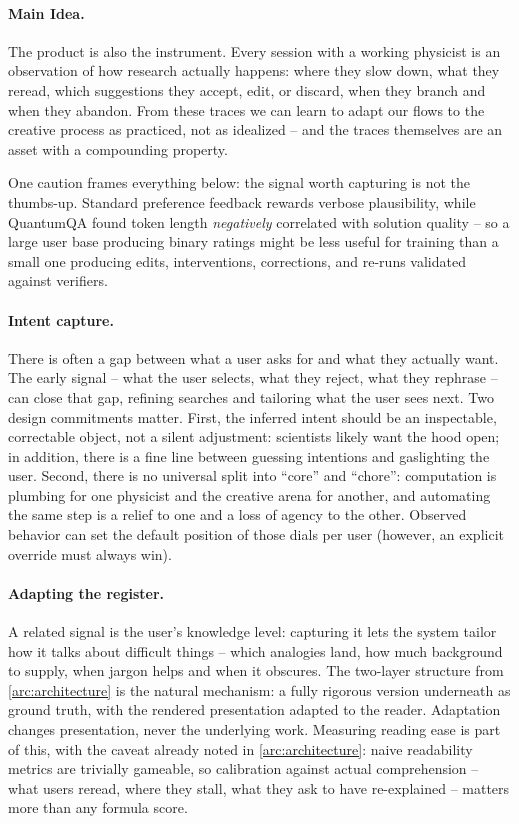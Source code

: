 \paragraph{Main Idea.}
The product is also the instrument. Every session with a working physicist is an observation of how research actually happens: where they slow down, what they reread, which suggestions they accept, edit, or discard, when they branch and when they abandon. From these traces we can learn to adapt our flows to the creative process as practiced, not as idealized -- and the traces themselves are an asset with a compounding property.

One caution frames everything below: the signal worth capturing is not the thumbs-up. Standard preference feedback rewards verbose plausibility, while QuantumQA found token length \emph{negatively} correlated with solution quality \cite{2604.18176} -- so a large user base producing binary ratings might be less useful for training than a small one producing edits, interventions, corrections, and re-runs validated against verifiers.

\paragraph{Intent capture.}
There is often a gap between what a user asks for and what they actually want. The early signal -- what the user selects, what they reject, what they rephrase -- can close that gap, refining searches and tailoring what the user sees next. Two design commitments matter. First, the inferred intent should be an inspectable, correctable object, not a silent adjustment: scientists likely want the hood open; in addition, there is a fine line between guessing intentions and gaslighting the user. Second, there is no universal split into ``core'' and ``chore'': computation is plumbing for one physicist and the creative arena for another, and automating the same step is a relief to one and a loss of agency to the other. Observed behavior can set the default position of those dials per user (however, an explicit override must always win).

\paragraph{Adapting the register.}
A related signal is the user's knowledge level: capturing it lets the system tailor how it talks about difficult things -- which analogies land, how much background to supply, when jargon helps and when it obscures. The two-layer structure from \ref{arc:architecture} is the natural mechanism: a fully rigorous version underneath as ground truth, with the rendered presentation adapted to the reader. Adaptation changes presentation, never the underlying work. Measuring reading ease is part of this, with the caveat already noted in \ref{arc:architecture}: naive readability metrics are trivially gameable, so calibration against actual comprehension -- what users reread, where they stall, what they ask to have re-explained -- matters more than any formula score.

